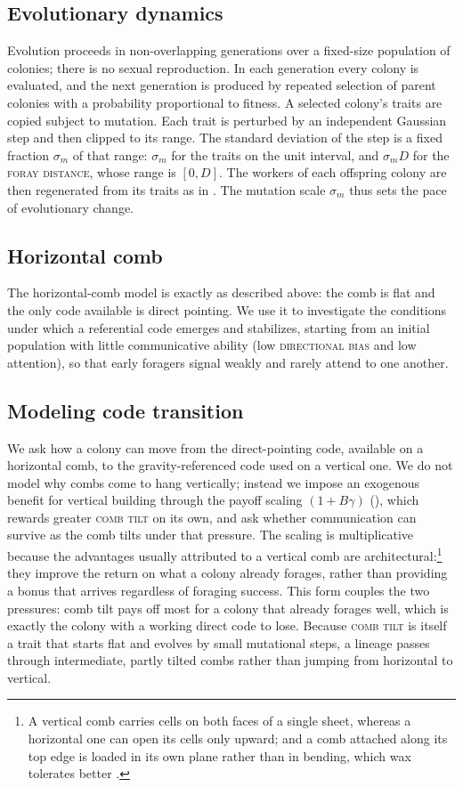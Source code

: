 \documentclass[11pt]{article}
\newcommand{\trait}[1]{\textsc{#1}}
\begin{document}
\subsection{Evolutionary dynamics}
\label{sec:evolution}
Evolution proceeds in non-overlapping generations over a fixed-size population of
colonies; there is no sexual reproduction. In each generation every colony is
evaluated, and the next generation is produced by repeated 
selection of parent colonies with a probability proportional to fitness. 
A selected colony's traits are copied subject to
mutation. Each trait is perturbed by an independent Gaussian step and then clipped to its
range. The standard deviation of the step is a fixed fraction $\sigma_m$ of that
range: $\sigma_m$ for the traits on the unit interval, and $\sigma_m D$ for the
\trait{foray distance}, whose range is $[0,D]$. The workers of each offspring colony are then regenerated from its traits
as in . The mutation scale $\sigma_m$ thus sets the pace of
evolutionary change.

\subsection{Horizontal comb}
\label{sec:horizontal}
The horizontal-comb model is exactly as described above: the comb is flat
and the only code available is direct pointing. We use it to
investigate the conditions under which a referential code emerges and stabilizes,
starting from an initial population with little communicative ability (low
\trait{directional bias} and low attention), so that early foragers signal weakly and
rarely attend to one another.

\subsection{Modeling code transition}
\label{sec:transition}
We ask how a colony can move from the direct-pointing code, available on a
horizontal comb, to the gravity-referenced code used on a vertical one. We do not
model why combs come to hang vertically; instead we impose an exogenous benefit
for vertical building through the payoff scaling $(1 + B\gamma)$
(), which rewards greater \trait{comb tilt} on its own, and ask
whether communication can survive as the comb tilts under that pressure. The
scaling is multiplicative because the advantages usually attributed to a vertical
comb are architectural:\footnote{A vertical comb carries cells on both faces of a
single sheet, whereas a horizontal one can open its cells only upward; and a comb
attached along its top edge is loaded in its own plane rather than in bending,
which wax tolerates better \citep{seeley1976nest,hepburn2014nests}.} they improve the return on what a colony
already forages, rather than providing a bonus that arrives regardless of
foraging success. This form couples the two pressures: comb tilt pays off
most for a colony that already forages well, which is exactly the colony
with a working direct code to lose. Because
\trait{comb tilt} is itself a trait that starts flat and evolves by small
mutational steps, a lineage passes through intermediate, partly tilted combs
rather than jumping from horizontal to vertical.
\end{document}
